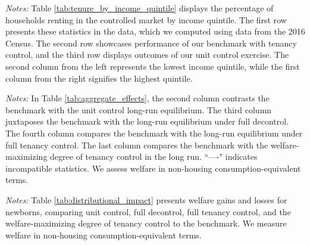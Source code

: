 \documentclass[parskip=full]{article}
\newenvironment{fignote2}[1]
{
\par
\medskip
\begin{minipage}{#1}
\footnotesize
}
{
\end{minipage}
}
\begin{document}
\begin{table}[H]
    \centering
    \caption{Households in controlled market by income quintile (all households)}
    \vspace{-0.5cm}
    \label{tab:tenure_by_income_quintile}    
    
    \vspace{-0.45cm}
    \begin{fignote2}{0.79\textwidth}
      \textit{Notes:} Table \ref{tab:tenure_by_income_quintile} displays the percentage of households renting in the controlled market by income quintile. The first row presents these statistics in the data, which we computed using data from the 2016 Census. The second row showcases performance of our benchmark with tenancy control, and the third row displays outcomes of our unit control exercise. The second column from the left represents the lowest income quintile, while the first column from the right signifies the highest quintile.  
    \end{fignote2}
\end{table}

\begin{table}[H]
    \centering
    \caption{Aggregate effects generated by changes in rent-control policy}
    \vspace{-0.5cm}
    \label{tab:aggregate_effects}
    
    \vspace{-0.45cm}
    \begin{fignote2}{1.02\textwidth}
      \textit{Notes:} In Table \ref{tab:aggregate_effects}, the second column contrasts the benchmark with the unit control long-run equilibrium. The third column juxtaposes the benchmark with the long-run equilibrium under full decontrol. The fourth column compares the benchmark with the long-run equilibrium under full tenancy control. The last column compares the benchmark with the welfare-maximizing degree of tenancy control in the long run. ``—-" indicates incompatible statistics. We assess welfare in non-housing consumption-equivalent terms.
    \end{fignote2}
\end{table}

\begin{table}[H]
    \centering
    \caption{Distributional impacts of rent-control policy changes on newborns' welfare, broken down by income quintile ($\%\Delta$ in welfare)}
    \vspace{-0.5cm}
    \label{tab:distributional_impact}
    
    \vspace{-0.45cm}
    \begin{fignote2}{0.77\textwidth}
      \textit{Notes:} Table \ref{tab:distributional_impact} presents welfare gains and losses for newborns, comparing unit control, full decontrol, full tenancy control, and the welfare-maximizing degree of tenancy control to the benchmark. We measure welfare in non-housing consumption-equivalent terms.
    \end{fignote2}
\end{table}
\end{document}

